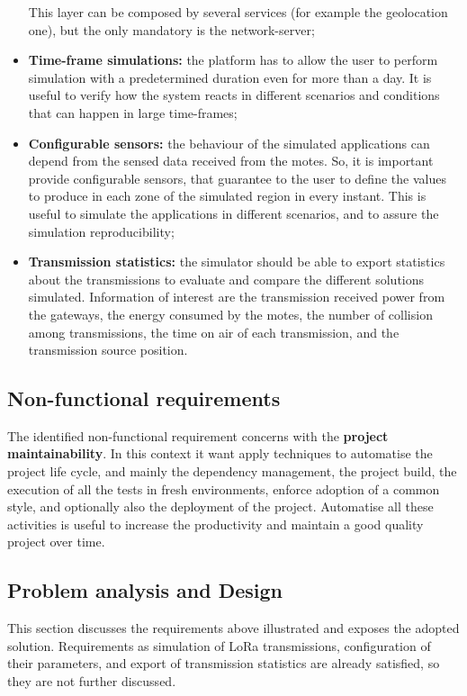 \begin{itemize}
    This layer can be composed by several services (for example the geolocation one), but the only mandatory is the network-server;
    \item \textbf{Time-frame simulations:} the platform has to allow the user to perform simulation with a predetermined duration even for more than a day. It is useful to verify how the system reacts in different scenarios and conditions that can happen in large time-frames; 
    \item \textbf{Configurable sensors:} the behaviour of the simulated applications can depend from the sensed data received from the motes. So, it is important provide configurable sensors, that guarantee to the user to define the values to produce in each zone of the simulated region in every instant.
    This is useful to simulate the applications in different scenarios, and to assure the simulation reproducibility;
    \item \textbf{Transmission statistics:} the simulator should be able to export statistics about the transmissions to evaluate and compare the different solutions simulated. Information of interest are the transmission received power from the gateways, the energy consumed by the motes, the number of collision among transmissions, the time on air of each transmission, and the transmission source position.
\end{itemize}

\subsection*{Non-functional requirements}

The identified non-functional requirement concerns with the \textbf{project maintainability}. 
In this context it want apply techniques to automatise the project life cycle, and mainly the dependency management, the project build, the execution of all the tests in fresh environments, enforce adoption of a common style, and optionally also the deployment of the project.
Automatise all these activities is useful to increase the productivity and maintain a good quality project over time.


\subsection{Problem analysis and Design}

This section discusses the requirements above illustrated and exposes the adopted solution. 
Requirements as simulation of LoRa transmissions, configuration of their parameters, and export of transmission statistics are already satisfied, so they are not further discussed.

